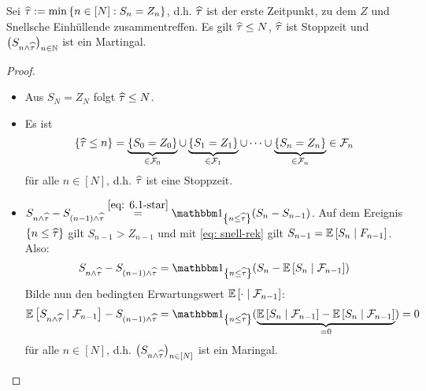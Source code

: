 \begin{lemma} \label{lemma: 6.4}
	Sei $\widehat{\tau} \mathrel{:=} \min\left\{ n \in [N] : S_n = Z_n \right\}$, d.h. $\widehat{\tau}$ ist der erste Zeitpunkt, zu dem $Z$ und Snellsche Einhüllende zusammentreffen. Es gilt $\widehat{\tau} \le N$, $\widehat{\tau}$ ist Stoppzeit und $\left( S_{n \land \widehat{\tau}} \right)_{n \in \mathbb{N}}$ ist ein Martingal.
\end{lemma}
\begin{proof}
	\begin{itemize}[nolistsep, leftmargin=*]
		\item Aus $S_N = Z_N$ folgt $\widehat{\tau} \le N$.
		\item Es ist
		\begin{equation*}
			\left\{ \widehat{\tau} \le n \right\} = \underbrace{\left\{ S_0 = Z_0 \right\}}_{\in \mathcal{F}_0} \cup \underbrace{\left\{ S_1 = Z_1 \right\}}_{\in \mathcal{F}_1} \cup \dots \cup \underbrace{\left\{ S_n = Z_n \right\}}_{\in \mathcal{F}_n} \in \mathcal{F}_n
		\end{equation*}
		für alle $n \in [N]$, d.h. $\widehat{\tau}$ ist eine Stoppzeit.
		\item $S_{n \land \dach{\tau}} - S_{(n-1) \land \dach{\tau}} \overset{\eqref{eq: 6.1-star}}{=} \one_{\menge{n \le \dach{\tau}}} (S_n - S_{n-1})$. Auf dem Ereignis $\left\{ n \le \widehat{\tau} \right\}$ gilt $S_{n-1} > Z_{n-1}$ und mit \eqref{eq: snell-rek} gilt $S_{n-1} = \mathbb{E} \left[ S_n \mid F_{n-1} \right]$. Also:
		\begin{equation*}
			S_{n \land \dach{\tau}} - S_{(n-1) \land \dach{\tau}} = \one_{\menge{n \le \dach{\tau}}} (S_n - \EW[S_n \mid \F_{n-1}])
		\end{equation*}
		Bilde nun den bedingten Erwartungswert $\mathbb{E} \left[ \cdot \mid \mathcal{F}_{n-1} \right]$:
		\begin{equation*}
			\EW[S_{n \land \dach{\tau}} \mid \F_{n-1}] - S_{(n-1) \land \dach{\tau}} = \one_{\menge{n \le \dach{\tau}}} (\underbrace{\EW[S_n \mid \F_{n-1}] - \EW[S_n \mid \F_{n-1}]}_{=0}) = 0
		\end{equation*}
		für alle $n \in [N]$, d.h. $\left( S_{n \land \widehat{\tau}} \right)_{n \in [N]}$ ist ein Maringal.
	\end{itemize}
\end{proof}

